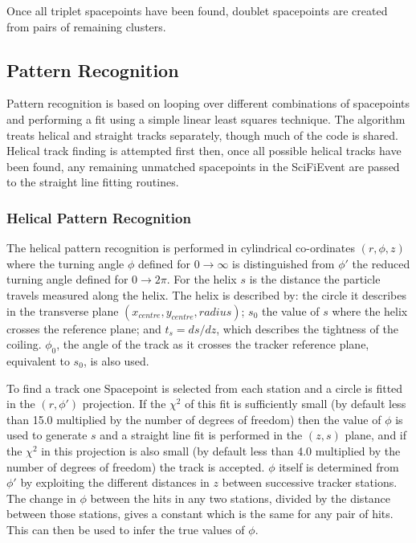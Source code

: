   Once all triplet spacepoints have been found, doublet spacepoints are created from pairs of remaining clusters. 


  \subsection{Pattern Recognition}
  \label{subsec:PatternRecognition}

  Pattern recognition is based on looping over different combinations of spacepoints and performing a fit using a simple linear least squares technique.  The algorithm treats helical and straight tracks separately, though much of the code is shared. Helical track finding is attempted first then, once all possible helical tracks have been found, any remaining unmatched spacepoints in the SciFiEvent are passed to the straight line fitting routines.

   \subsubsection{Helical Pattern Recognition}
   \label{subsubsec:HelicalPatternRecognition}

   The helical pattern recognition is performed in cylindrical co-ordinates $(r, \phi, z)$ where the turning angle $\phi$ defined for $0 \rightarrow \infty$ is distinguished from $\phi '$ the reduced turning angle defined  for $0 \rightarrow 2\pi$. For the helix $s$ is the distance the particle travels measured along the helix. The helix is described by: the circle it describes in the transverse plane $(x_{centre}, y_{centre}, radius)$; $s_0$ the value of $s$ where the helix crosses the reference plane; and $t_s = ds/dz$, which describes the tightness of the coiling. $\phi_0$, the angle of the track as it crosses the tracker reference plane, equivalent to $s_0$, is also used. 

   To find a track one Spacepoint is selected from each station and a circle is fitted in the $(r, \phi')$ projection. If the $\chi^2$ of this fit is sufficiently small (by default less than 15.0 multiplied by the number of degrees of freedom) then the value of $\phi$ is used to generate $s$ and a straight line fit is performed in the $(z,s)$ plane, and if the $\chi^2$ in this projection is also small (by default less than 4.0 multiplied by the number of degrees of freedom) the track is accepted.  $\phi$ itself is determined from $\phi'$ by exploiting the different distances in $z$ between successive tracker stations.  The change in $\phi$ between the hits in any two stations, divided by the distance between those stations, gives a constant which is the same for any pair of hits.  This can then be used to infer the true values of $\phi$.

